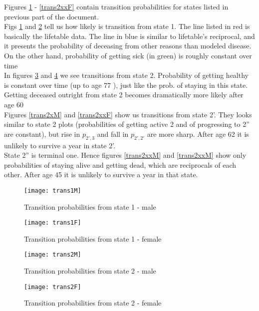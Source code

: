 \documentclass[11pt,wide]{mwart}
\begin{document}
Figures \ref{trans1M} - \ref{trans2xxF} contain transition probabilities for states listed in previous part of the document.\\
Figs \ref{trans1M} and \ref{trans1F} tell us how likely is transition from state 1. The line listed in red is basically the lifetable data. The line in blue is similar to lifetable's reciprocal, and it presents the probability of deceasing from other reasons than modeled disease. On the other hand, probability of getting sick (in green) is roughly constant over time\\
In figures \ref{trans2M} and \ref{trans2F} we see transitions from state 2. Probability of getting healthy is constant over time (up to age 77 ), just like the prob. of staying in this state. Getting deceased outright from state 2 becomes dramatically more likely after age 60\\
Figures \ref{trans2xM} and \ref{trans2xxF} show us transitions from state 2'. They looks similar to state 2 plots (probabilities of getting active 2 and of progressing to 2'' are constant), but rise in $p_{2',3}$ and fall in $p_{2',2'}$ are more sharp. After age 62 it is unlikely to survive a year in state 2'.\\
State 2'' is terminal one. Hence figures \ref{trans2xxM} and \ref{trans2xxM} show only probabilities of staying alive and getting dead, which are reciprocals of each other. After age 45 it is unlikely to survive a year in that state.

\begin{figure}[!htbp]
	\caption{Transition probabilities from state 1 - male}
	\label{trans1M}
	\texttt{[image: trans1M]}
	\centering
\end{figure}

\begin{figure}[!htbp]
	\caption{Transition probabilities from state 1 - female}
	\label{trans1F}
	\texttt{[image: trans1F]}
	\centering
\end{figure}


\begin{figure}[!htbp]
	\caption{Transition probabilities from state 2 - male}
	\label{trans2M}
	\texttt{[image: trans2M]}
	\centering
\end{figure}

\begin{figure}[!htbp]
	\caption{Transition probabilities from state 2 - female}
	\label{trans2F}
	\texttt{[image: trans2F]}
	\centering
\end{figure}
\end{document}
